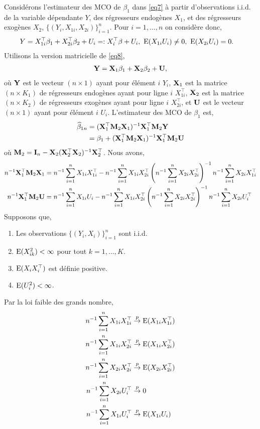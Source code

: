  Considérons l'estimateur des MCO de $\beta_1$ dans \eqref{eq7} à partir d'observations i.i.d. de la variable dépendante $Y$,
 des régresseurs endogènes $X_1$, et des régresseurs exogènes $X_2$, $\{(Y_i, X_{1i}, X_{2i})\}_{i=1}^n$. 
 Pour $i=1, \ldots, n$ on considère donc,
\begin{align}
	Y &= X_{1i}^\top\beta_1 + X_{2i}^\top\beta_2 + U_i =: X_i^\top\beta + U_i, \ \operatorname{E}(X_{1i}U_i) \neq 0, \ \operatorname{E}(X_{2i}U_i) = 0.
	\label{eq8}
 \end{align}
 Utilisons la version matricielle de \eqref{eq8},
\begin{align*}
	\mathbf Y = \mathbf X_1\beta_1 + \mathbf X_2\beta_2 + \mathbf U,
	\end{align*}
	où $\mathbf Y$ est le vecteur $(n\times 1)$ ayant pour élément $i$ $Y_i$, $\mathbf X_1$ est la matrice $(n\times K_1)$ de régresseurs endogènes ayant pour ligne $i$ $X_{1i}^\top$, $\mathbf X_2$ est la matrice $(n\times K_2)$ de régresseurs exogènes ayant pour ligne $i$ $X_{2i}^\top$, et $\mathbf U$ est le vecteur $(n\times 1)$ ayant pour élément $i$ $U_i$. L'estimateur des MCO de $\beta_1$ est,
	\begin{align*}
	\widehat{\beta}_{1n} &= (\mathbf X_1^\top\mathbf M_2\mathbf X_1)^{-1}\mathbf X_1^\top\mathbf M_2\mathbf Y \\
	&=\beta_1 +(\mathbf X_1^\top\mathbf M_2\mathbf X_1)^{-1}\mathbf X_1^\top\mathbf M_2\mathbf U
	\end{align*}
	où $\mathbf M_2 = \mathbf{I}_n - \mathbf X_2(\mathbf X_2^\top\mathbf X_2)^{-1}\mathbf X_2^\top$. Nous avons,
	\begin{align*}
	n^{-1}\mathbf X_1^\top\mathbf M_2\mathbf X_1 &= n^{-1}\sum_{i=1}^n X_{1i}X_{1i}^\top - n^{-1}\sum_{i=1}^n X_{1i}X_{2i}^\top\left(n^{-1}\sum_{i=1}^n X_{2i}X_{2i}^\top\right)^{-1} n^{-1}\sum_{i=1}^n X_{2i}X_{1i}^\top\\
	n^{-1}\mathbf X_1^\top\mathbf M_2\mathbf U &= n^{-1}\sum_{i=1}^n X_{1i}U_i - n^{-1}\sum_{i=1}^n X_{1i}X_{2i}^\top\left(n^{-1}\sum_{i=1}^n X_{2i}X_{2i}^\top\right)^{-1} n^{-1}\sum_{i=1}^n X_{2i}U_i^\top
	\end{align*}
	Supposons que,
	\begin{enumerate}[label = (A.\arabic*)]
	\item Les observations $\{(Y_i, X_i)\}_{i=1}^n$ sont i.i.d.
	\item $\operatorname{E}(X_{ik}^2) < \infty$ pour tout $k=1,...,K$.
	\item $\operatorname{E}(X_iX_i^\top)$ est définie positive.
	\item $\operatorname{E}(U_i^2) < \infty$.
	\end{enumerate}
	Par la loi faible des grands nombre,
	\begin{align*}
	n^{-1}\sum_{i=1}^n X_{1i}X_{1i}^\top &\overset{p}{\rightarrow} \operatorname{E}(X_{1i}X_{1i}^\top)\\
	n^{-1}\sum_{i=1}^n X_{1i}X_{2i}^\top &\overset{p}{\rightarrow} \operatorname{E}(X_{1i}X_{2i}^\top)\\
	n^{-1}\sum_{i=1}^n X_{2i}X_{2i}^\top &\overset{p}{\rightarrow} \operatorname{E}(X_{2i}X_{2i}^\top)\\
	n^{-1}\sum_{i=1}^n X_{2i}U_i^\top &\overset{p}{\rightarrow} 0\\
	n^{-1}\sum_{i=1}^n X_{1i}U_i^\top &\overset{p}{\rightarrow} \operatorname{E}(X_{1i}U_i)
	\end{align*}
